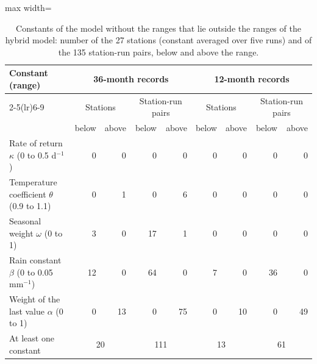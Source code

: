 \begin{table}[tbp]
\centering
\caption{Constants of the model without the ranges that lie outside the ranges of the hybrid model: number of the 27 stations (constant averaged over five runs) and of the 135 station-run pairs, below and above the range.}
\label{tab:S_ranges}
\footnotesize
\setlength{\tabcolsep}{3.5pt}
\begin{adjustbox}{max width=\textwidth}
\begin{tabular}{lrrrrrrrr}
\toprule
Constant (range) & \multicolumn{4}{c}{36-month records} & \multicolumn{4}{c}{12-month records} \\ \cmidrule(lr){2-5}\cmidrule(lr){6-9}
 & \multicolumn{2}{c}{Stations} & \multicolumn{2}{c}{Station-run pairs} & \multicolumn{2}{c}{Stations} & \multicolumn{2}{c}{Station-run pairs} \\
 & below & above & below & above & below & above & below & above \\
\midrule
Rate of return $\kappa$ (0 to 0.5 d$^{-1}$) & 0 & 0 & 0 & 0 & 0 & 0 & 0 & 0 \\
Temperature coefficient $\theta$ (0.9 to 1.1) & 0 & 1 & 0 & 6 & 0 & 0 & 0 & 0 \\
Seasonal weight $\omega$ (0 to 1) & 3 & 0 & 17 & 1 & 0 & 0 & 0 & 0 \\
Rain constant $\beta$ (0 to 0.05 mm$^{-1}$) & 12 & 0 & 64 & 0 & 7 & 0 & 36 & 0 \\
Weight of the last value $\alpha$ (0 to 1) & 0 & 13 & 0 & 75 & 0 & 10 & 0 & 49 \\
\midrule
At least one constant & \multicolumn{2}{c}{20} & \multicolumn{2}{c}{111} & \multicolumn{2}{c}{13} & \multicolumn{2}{c}{61} \\
\bottomrule
\end{tabular}
\end{adjustbox}
\end{table}
